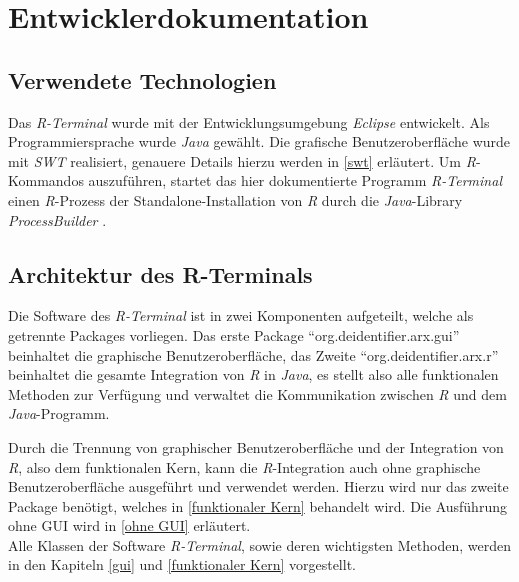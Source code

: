 \documentclass[a4paper, 12pt]{report} %
\begin{document}
\newpage

\chapter{Entwicklerdokumentation}

\section{Verwendete Technologien}

Das \textit{R-Terminal} wurde mit der Entwicklungsumgebung \textit{Eclipse} \cite{eclipse} entwickelt.
Als Programmiersprache wurde \textit{Java} \cite{java} gewählt. Die grafische Benutzeroberfläche wurde mit \textit{SWT} \cite{swt} realisiert, genauere Details hierzu werden in \ref{swt} erläutert.
Um \textit{R}-Kommandos auszuführen, startet das hier dokumentierte Programm \textit{R-Terminal} einen \textit{R}-Prozess der Standalone-Installation von \textit{R} durch die \textit{Java}-Library \textit{ProcessBuilder} \cite{processBuilder}.


\section{Architektur des R-Terminals}

Die Software des \textit{R-Terminal} ist in zwei Komponenten aufgeteilt, welche als getrennte Packages vorliegen. Das erste Package "`org.deidentifier.arx.gui"' beinhaltet die graphische Benutzeroberfläche, das Zweite "`org.deidentifier.arx.r"' beinhaltet die gesamte Integration von \textit{R} in \textit{Java}, es stellt also alle funktionalen Methoden zur Verfügung und verwaltet die Kommunikation zwischen \textit{R} und dem \textit{Java}-Programm.

Durch die Trennung von graphischer Benutzeroberfläche und der Integration von \textit{R}, also dem funktionalen Kern, kann die \textit{R}-Integration auch ohne graphische Benutzeroberfläche ausgeführt und verwendet werden. Hierzu wird nur das zweite Package benötigt, welches in \ref{funktionaler Kern} behandelt wird. Die Ausführung ohne GUI wird in \ref{ohne GUI} erläutert.\\

Alle Klassen der Software \textit{R-Terminal}, sowie deren wichtigsten Methoden, werden in den Kapiteln \ref{gui} und \ref{funktionaler Kern} vorgestellt.
\end{document}
